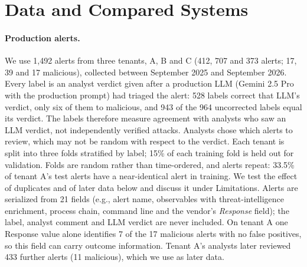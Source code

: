 \documentclass[letterpaper]{article} %
\begin{document}
\section{Data and Compared Systems}

\paragraph{Production alerts.} We use 1,492 alerts from three tenants, A, B and C (412, 707 and 373 alerts; 17, 39 and 17 malicious), collected between September 2025 and September 2026. Every label is an analyst verdict given after a production LLM (Gemini 2.5 Pro with the production prompt) had triaged the alert: 528 labels correct that LLM's verdict, only six of them to malicious, and 943 of the 964 uncorrected labels equal its verdict. The labels therefore measure agreement with analysts who saw an LLM verdict, not independently verified attacks. Analysts chose which alerts to review, which may not be random with respect to the verdict. Each tenant is split into three folds stratified by label; 15\% of each training fold is held out for validation. Folds are random rather than time-ordered, and alerts repeat: 33.5\% of tenant A's test alerts have a near-identical alert in training. We test the effect of duplicates and of later data below and discuss it under Limitations. Alerts are serialized from 21 fields (e.g., alert name, observables with threat-intelligence enrichment, process chain, command line and the vendor's \emph{Response} field); the label, analyst comment and LLM verdict are never included. On tenant A one Response value alone identifies 7 of the 17 malicious alerts with no false positives, so this field can carry outcome information. Tenant A's analysts later reviewed 433 further alerts (11 malicious), which we use as later data.
\end{document}
